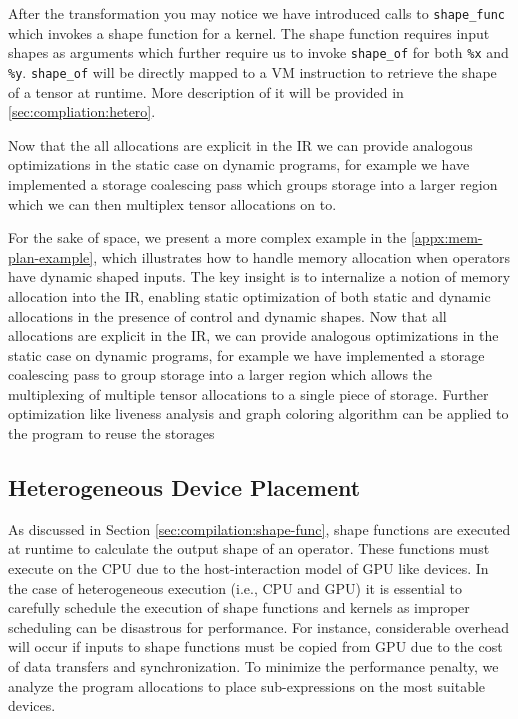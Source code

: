 After the transformation you may notice we have introduced calls to \verb|shape_func| which invokes a shape function for a kernel. The shape function requires input shapes as arguments which further require us to invoke \verb|shape_of| for both \verb|%x| and \verb|%y|. \verb|shape_of| will be directly mapped to a VM instruction to retrieve the shape of a tensor at runtime. More description of it will be provided in \autoref{sec:compliation:hetero}.

Now that the all allocations are explicit in the IR we can provide analogous optimizations in the static
case on dynamic programs, for example we have implemented a storage coalescing pass which groups storage
into a larger region which we can then multiplex tensor allocations on to.

For the sake of space, we present a more complex example in the \autoref{appx:mem-plan-example}, which illustrates how to handle memory allocation when operators have dynamic shaped inputs.
The key insight is to internalize a notion of memory allocation into the IR, enabling static optimization of
both static and dynamic allocations in the presence of control and dynamic shapes.
Now that all allocations are explicit in the IR, we can provide analogous optimizations in the static
case on dynamic programs, for example we have implemented a storage coalescing pass to group storage
into a larger region which allows the multiplexing of multiple tensor allocations to a single piece of storage.
Further optimization like liveness analysis and graph coloring algorithm can be applied to the program to reuse  the storages

\subsection{Heterogeneous Device Placement}
\label{sec:optimizations:hetero}

As discussed in Section \autoref{sec:compilation:shape-func}, shape functions are executed at runtime to calculate the output shape of an operator. These functions must execute on the CPU due to the host-interaction model of GPU like devices. In the case of heterogeneous execution (i.e., CPU and GPU) it is essential to carefully schedule the execution of shape functions and kernels as improper scheduling can be disastrous for performance. For instance, considerable overhead will occur if inputs to shape functions must be copied from GPU due to the cost of data transfers and synchronization. To minimize the performance penalty, we analyze the program allocations to place sub-expressions on the most suitable devices.

